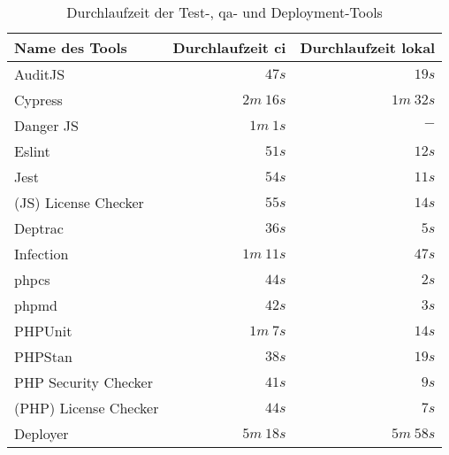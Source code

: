 \begin{table}[H]
    \centering
    \begin{tabular}{|p{4cm}||p{4cm}|p{4cm}|}
        \hline
        Name des Tools & Durchlaufzeit \acrshort{ci} & Durchlaufzeit lokal                      \\
        \hline
        AuditJS               & \multicolumn{1}{r|}{$47s$}     & \multicolumn{1}{r|}{$19s$}     \\
        Cypress               & \multicolumn{1}{r|}{$2m\ 16s$} & \multicolumn{1}{r|}{$1m\ 32s$} \\
        Danger JS             & \multicolumn{1}{r|}{$1m\ 1s$}  & \multicolumn{1}{r|}{$-$}       \\
        Eslint                & \multicolumn{1}{r|}{$51s$}     & \multicolumn{1}{r|}{$12s$}     \\
        Jest                  & \multicolumn{1}{r|}{$54s$}     & \multicolumn{1}{r|}{$11s$}     \\
        (JS) License Checker  & \multicolumn{1}{r|}{$55s$}     & \multicolumn{1}{r|}{$14s$}     \\
        \hline
        Deptrac               & \multicolumn{1}{r|}{$36s$}     & \multicolumn{1}{r|}{$5s$}      \\
        Infection             & \multicolumn{1}{r|}{$1m\ 11s$} & \multicolumn{1}{r|}{$47s$}     \\
        \acrshort{phpcs}      & \multicolumn{1}{r|}{$44s$}     & \multicolumn{1}{r|}{$2s$}      \\
        \acrshort{phpmd}      & \multicolumn{1}{r|}{$42s$}     & \multicolumn{1}{r|}{$3s$}      \\
        PHPUnit               & \multicolumn{1}{r|}{$1m\ 7s$}  & \multicolumn{1}{r|}{$14s$}     \\
        PHPStan               & \multicolumn{1}{r|}{$38s$}     & \multicolumn{1}{r|}{$19s$}     \\
        PHP Security Checker  & \multicolumn{1}{r|}{$41s$}     & \multicolumn{1}{r|}{$9s$}      \\
        (PHP) License Checker & \multicolumn{1}{r|}{$44s$}     & \multicolumn{1}{r|}{$7s$}      \\
        \hline
        Deployer              & \multicolumn{1}{r|}{$5m\ 18s$} & \multicolumn{1}{r|}{$5m\ 58s$} \\
        \hline
    \end{tabular}
    \caption{Durchlaufzeit der Test-, \acrshort{qa}- und Deployment-Tools}
    \label{tab:ci-tools-time}
\end{table}


